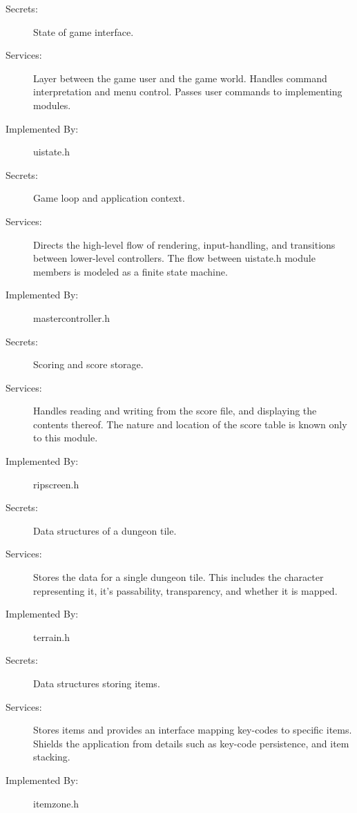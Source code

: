 \documentclass[12pt, titlepage]{article}
\begin{document}
\begin{description}
\item[Secrets:]State of game interface.
\item[Services:]Layer between the game user and the game world. 
Handles command interpretation and menu control. Passes user commands
to implementing modules.
\item[Implemented By:]uistate.h
\end{description}

\begin{description}
\item[Secrets:]Game loop and application context.
\item[Services:]Directs the high-level flow of rendering, input-handling, and
transitions between lower-level controllers. The flow between uistate.h module
members is modeled as a finite state machine.
\item[Implemented By:]mastercontroller.h
\end{description}

\begin{description}
\item[Secrets:]Scoring and score storage.
\item[Services:]Handles reading and writing from the score file,
and displaying the contents thereof. The nature and location of the
score table is known only to this module.
\item[Implemented By:]ripscreen.h
\end{description}

\begin{description}
\item[Secrets:]Data structures of a dungeon tile.
\item[Services:]Stores the data for a single dungeon tile. This includes
the character representing it, it's passability, transparency, and whether
it is mapped.
\item[Implemented By:]terrain.h
\end{description}

\begin{description}
\item[Secrets:]Data structures storing items.
\item[Services:]Stores items and provides an interface mapping key-codes
to specific items. Shields the application from details such as key-code persistence,
and item stacking. 
\item[Implemented By:]itemzone.h
\end{description}
\end{document}
